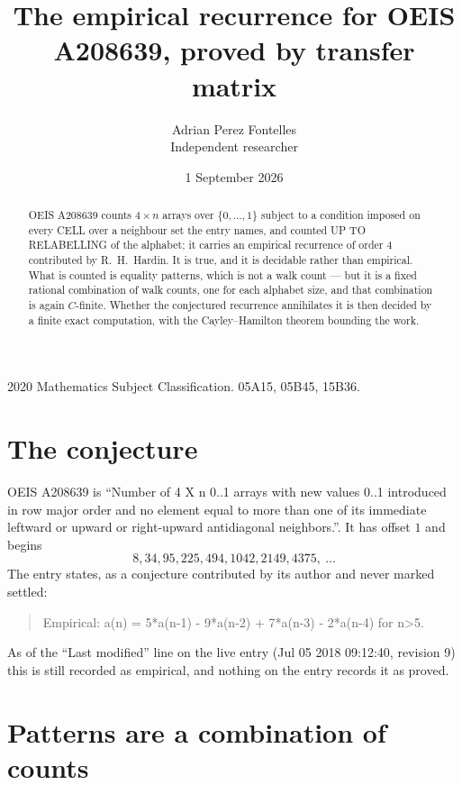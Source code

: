 \documentclass[11pt,a4paper]{article}
\title{The empirical recurrence for OEIS A208639, proved by transfer matrix}
\author{Adrian Perez Fontelles\\ \small Independent researcher}
\date{1 September 2026}
\theoremstyle{plain}
\theoremstyle{definition}
\begin{document}
\maketitle

\begin{abstract}
OEIS A208639 counts $4\times n$ arrays over $\{0,\dots,1\}$ subject to a condition imposed on
every CELL over a neighbour set the entry names, and counted UP TO RELABELLING of the
alphabet; it carries an empirical recurrence of order $4$ contributed by
R.~H.~Hardin. It is true, and it is decidable rather than empirical. What is counted is
equality patterns, which is not a walk count --- but it is a fixed rational combination of
walk counts, one for each alphabet size, and that combination is again $C$-finite. Whether the
conjectured recurrence annihilates it is then decided by a finite exact computation, with the
Cayley--Hamilton theorem bounding the work.
\end{abstract}

\noindent\small 2020 Mathematics Subject Classification. 05A15, 05B45, 15B36.\normalsize

\section{The conjecture}

OEIS A208639 is ``Number of 4 X n 0..1 arrays with new values 0..1 introduced in row major order and no element equal to more than one of its immediate leftward or upward or right-upward antidiagonal neighbors.''. It has offset $1$ and begins
\[
8, 34, 95, 225, 494, 1042, 2149, 4375,\ \dots
\]
The entry states, as a conjecture contributed by its author and never marked settled:
\begin{quote}
Empirical: a(n) = 5*a(n-1) - 9*a(n-2) + 7*a(n-3) - 2*a(n-4) for n>5.
\end{quote}
As of the ``Last modified'' line on the live entry (Jul 05 2018 09:12:40, revision 9) this is still
recorded as empirical, and nothing on the entry records it as proved.

\section{Patterns are a combination of counts}
\end{document}
